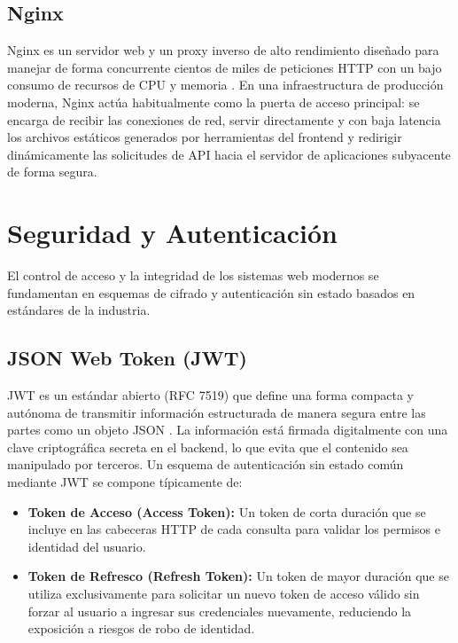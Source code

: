 \subsection{Nginx}
Nginx es un servidor web y un proxy inverso de alto rendimiento diseñado para manejar de forma concurrente cientos de miles de peticiones HTTP con un bajo consumo de recursos de CPU y memoria \cite{reese2008}. En una infraestructura de producción moderna, Nginx actúa habitualmente como la puerta de acceso principal: se encarga de recibir las conexiones de red, servir directamente y con baja latencia los archivos estáticos generados por herramientas del frontend y redirigir dinámicamente las solicitudes de API hacia el servidor de aplicaciones subyacente de forma segura.



\section{Seguridad y Autenticación}

El control de acceso y la integridad de los sistemas web modernos se fundamentan en esquemas de cifrado y autenticación sin estado basados en estándares de la industria.

\subsection{JSON Web Token (JWT)}
JWT es un estándar abierto (RFC 7519) que define una forma compacta y autónoma de transmitir información estructurada de manera segura entre las partes como un objeto JSON \cite{rfc7519}. La información está firmada digitalmente con una clave criptográfica secreta en el backend, lo que evita que el contenido sea manipulado por terceros. Un esquema de autenticación sin estado común mediante JWT se compone típicamente de:
\begin{itemize}
    \item \textbf{Token de Acceso (Access Token):} Un token de corta duración que se incluye en las cabeceras HTTP de cada consulta para validar los permisos e identidad del usuario.
    \item \textbf{Token de Refresco (Refresh Token):} Un token de mayor duración que se utiliza exclusivamente para solicitar un nuevo token de acceso válido sin forzar al usuario a ingresar sus credenciales nuevamente, reduciendo la exposición a riesgos de robo de identidad.
\end{itemize}


